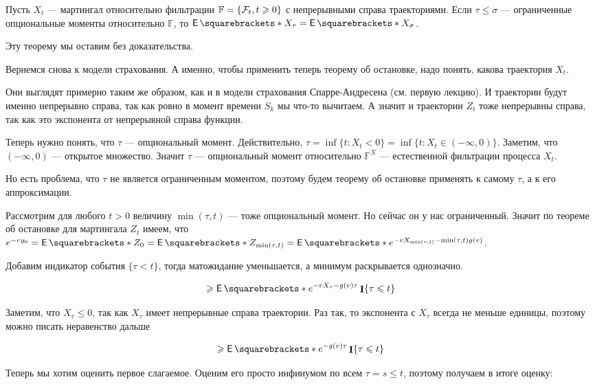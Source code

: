\begin{theorem}
  Пусть $X_t$ --- мартингал относительно фильтрации $\mathbb{F} = \{\mathcal{F}_t, t \geqslant 0\}$
  с непрерывными справа траекториями. Если $\tau \leq \sigma$ --- ограниченные
  опциональные моменты относительно $\mathbb{F}$, то $\E{X_\tau} = \E{X_\sigma}$.
\end{theorem}

Эту теорему мы оставим без доказательства.

Вернемся снова к модели страхования. А именно, чтобы применить теперь теорему
об остановке, надо понять, какова траектория $X_t$.

Они выглядят примерно таким же образом, как и в модели страхования Спарре-Андресена
(см. первую лекцию). И траектории будут именно непрерывно справа, так как ровно
в момент времени $S_k$ мы что-то вычитаем. А значит и траектории $Z_t$ тоже
непрерывны справа, так как это экспонента от непрерывной справа функции.

Теперь нужно понять, что $\tau$ --- опциональный момент. Действительно,
$\tau = \inf\{t : X_t < 0\} = \inf\{t: X_t \in (-\infty, 0)\}$. Заметим,
что $(-\infty, 0)$ --- открытое множество. Значит $\tau$ --- опциональный
момент относительно $\mathbb{F}^X$ --- естественной фильтрации процесса $X_t$.

Но есть проблема, что $\tau$ не является ограниченным моментом, поэтому будем
теорему об остановке применять к самому $\tau$, а к его аппроксимации.

Рассмотрим для любого $t > 0$ величину $\min(\tau, t)$ --- тоже опциональный момент.
Но сейчас он у нас ограниченный. Значит по теореме об остановке для мартингала
$Z_t$ имеем, что $e^{-vy_0} = \E{Z_0} = \E{Z_{\min(\tau, t)}} =
\E{e^{-vX_{\min(\tau, t)} - \min(\tau, t)g(v)}}$. 

Добавим индикатор события $\{\tau < t\}$, тогда матожидание уменьшается, а минимум
раскрывается однозначно.

\[
  \geq \E{e^{-vX_\tau - g(v)\tau} \I\{\tau \leq t\}}
\]

Заметим, что $X_\tau \leq 0$, так как $X_\tau$ имеет непрерывные справа траектории.
Раз так, то экспонента с $X_\tau$ всегда не меньше единицы, поэтому можно писать
неравенство дальше

\[
  \geq \E{e^{-g(v)\tau} \I\{\tau \leq t\}}
\] 

Теперь мы хотим оценить первое слагаемое. Оценим его просто инфинумом по всем
$\tau = s \leq t$, поэтому получаем в итоге оценку:

